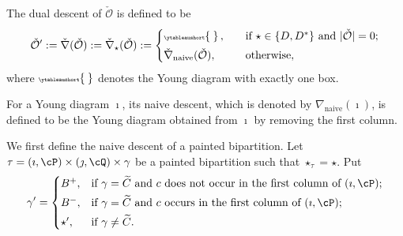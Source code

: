 \documentclass[11pt,a4paper]{amsart}
\newcommand{\CO}{{\mathcal {O}}}
\def\eDD{\overline{\nabla}}
\newcommand{\be}{\begin {equation}}
\newcommand{\ee}{\end {equation}}
\numberwithin{equation}{section}
\theoremstyle{remark}
\let\ytb=\ytableaushort
\newcommand{\tytb}[1]{{\tiny\ytb{#1}}}
\begin{document}
   The dual descent of $\check \CO$ is defined to be
  \be\label{duald}
   \check \CO':=\check \nabla(\check \CO):=\check \nabla_\star( \check \CO):=\begin{cases}
   \tytb{\   }\, , \quad& \textrm{if $\star\in \{D, D^*\}$ and $|\check \CO|=0$};\smallskip\\
   \check \nabla_{\mathrm{naive}}(\check \CO), \quad & \textrm{otherwise},
    \end{cases}
  \ee
  where $\tytb{\   }$ denotes the Young diagram with exactly one box.


For a Young diagram $\imath$, its naive descent, which is denoted by $\nabla_\mathrm{naive}(\imath)$, is defined to be the Young diagram obtained from $\imath$ by removing the first column.

\def\bipartl{\mathrm{bi\cP_L}}
\def\bipartr{\mathrm{bi\cP_R}}
\def\dsdiagl{\mathrm{DS_L}}
\def\dsdiagr{\mathrm{DS_R}}
\def\DDl{\eDD_\mathrm{L}}
\def\DDr{\eDD_\mathrm{R}}

We first define the naive descent of a painted bipartition. Let $\tau=(\imath,\cP)\times (\jmath,\cQ)\times \gamma $ be a  painted bipartition such that $\star_\tau=\star$. Put
  \begin{equation} \label{eq:def.alphap}
    \gamma '=\begin{cases} B^+,
  & \textrm{if $\gamma =\widetilde{C}$ and $c$ does not occur in the first column of $(\imath,\cP)$}; \smallskip \\
  B^-,
  & \textrm{if $\gamma =\widetilde{C}$ and  $c$ occurs in the first column of $(\imath,\cP)$}; \smallskip \\
  \star', & \textrm{if $\gamma \neq \widetilde C$}.
  \end{cases}
  \end{equation}
\end{document}
